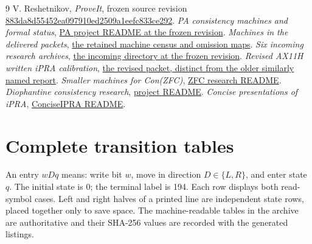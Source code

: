 \documentclass[11pt,a4paper]{article}
\theoremstyle{definition}\newtheorem{definition}[theorem]{Definition}
\theoremstyle{remark}\newtheorem{remark}[theorem]{Remark}
\begin{document}
\begin{thebibliography}{9}
 V. Reshetnikov, \emph{ProveIt}, frozen source revision
\href{https://github.com/VladimirReshetnikov/ProveIt/tree/883da8d55452ea097910ed2509a1eefc833ce292}{883da8d55452ea097910ed2509a1eefc833ce292}.
 \emph{PA consistency machines and formal status},
\href{https://github.com/VladimirReshetnikov/ProveIt/blob/883da8d55452ea097910ed2509a1eefc833ce292/Computability/BusyBeaver/Research/PA/README.md}{PA project README at the frozen revision}.
 \emph{Machines in the delivered packets},
\href{https://github.com/VladimirReshetnikov/ProveIt/blob/883da8d55452ea097910ed2509a1eefc833ce292/Computability/BusyBeaver/Research/PA/docs/MACHINES.md}{the retained machine census and omission maps}.
 \emph{Six incoming research archives},
\href{https://github.com/VladimirReshetnikov/ProveIt/tree/883da8d55452ea097910ed2509a1eefc833ce292/docs/incoming}{the incoming directory at the frozen revision}.
 \emph{Revised AX11H written iPRA calibration},
\href{https://github.com/VladimirReshetnikov/ProveIt/tree/883da8d55452ea097910ed2509a1eefc833ce292/Computability/BusyBeaver/Research/PA/docs/pa194_ax11h_research_2026-11-14_2}{the revised packet, distinct from the older similarly named report}.
 \emph{Smaller machines for Con(ZFC)},
\href{https://github.com/VladimirReshetnikov/ProveIt/blob/883da8d55452ea097910ed2509a1eefc833ce292/Computability/BusyBeaver/Research/ZFC/README.md}{ZFC research README}.
 \emph{Diophantine consistency research},
\href{https://github.com/VladimirReshetnikov/ProveIt/blob/883da8d55452ea097910ed2509a1eefc833ce292/Computability/DiophantineConsistency/README.md}{project README}.
 \emph{Concise presentations of iPRA},
\href{https://github.com/VladimirReshetnikov/ProveIt/blob/883da8d55452ea097910ed2509a1eefc833ce292/Logic/PrimitiveRecursiveArithmetic/ConciseIPRA/README.md}{ConciseIPRA README}.
\end{thebibliography}

\appendix
\section{Complete transition tables}\label{app:tables}
An entry $wDq$ means: write bit $w$, move in direction $D\in\{L,R\}$,
and enter state $q$. The initial state is 0; the terminal label is 194.
Each row displays both read-symbol cases. Left and right halves of a
printed line are independent state rows, placed together only to save space.
The machine-readable tables in the archive are authoritative and their
SHA-256 values are recorded with the generated listings.


\end{document}
